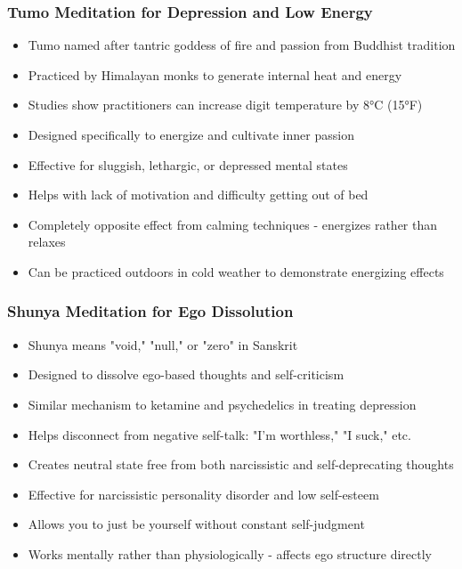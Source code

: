 \begin{frame}[fragile]\frametitle{Tumo Meditation for Depression and Low Energy}
      \begin{itemize}
	\item Tumo named after tantric goddess of fire and passion from Buddhist tradition
	\item Practiced by Himalayan monks to generate internal heat and energy
	\item Studies show practitioners can increase digit temperature by 8°C (15°F)
	\item Designed specifically to energize and cultivate inner passion
	\item Effective for sluggish, lethargic, or depressed mental states
	\item Helps with lack of motivation and difficulty getting out of bed
	\item Completely opposite effect from calming techniques - energizes rather than relaxes
	\item Can be practiced outdoors in cold weather to demonstrate energizing effects
	  \end{itemize}
\end{frame}

\begin{frame}[fragile]\frametitle{Shunya Meditation for Ego Dissolution}
      \begin{itemize}
	\item Shunya means "void," "null," or "zero" in Sanskrit
	\item Designed to dissolve ego-based thoughts and self-criticism
	\item Similar mechanism to ketamine and psychedelics in treating depression
	\item Helps disconnect from negative self-talk: "I'm worthless," "I suck," etc.
	\item Creates neutral state free from both narcissistic and self-deprecating thoughts
	\item Effective for narcissistic personality disorder and low self-esteem
	\item Allows you to just be yourself without constant self-judgment
	\item Works mentally rather than physiologically - affects ego structure directly
	  \end{itemize}
\end{frame}

